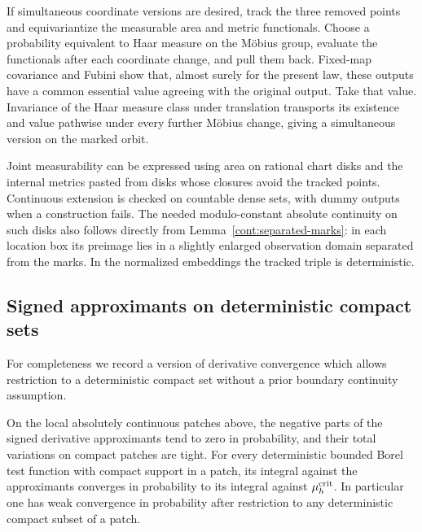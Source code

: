 \begin{remark}
\label{cont:orbit-versions}
If simultaneous coordinate versions are desired, track the three removed
points and equivariantize the measurable area and metric functionals.
Choose a probability equivalent to Haar measure on the M\"obius group,
evaluate the functionals after each coordinate change, and pull them back.
Fixed-map covariance and Fubini show that, almost surely for the present
law, these outputs have a common essential value agreeing with the
original output.  Take that value.  Invariance of the Haar measure class
under translation transports its existence and value pathwise under every
further M\"obius change, giving a simultaneous version on the marked orbit.

Joint measurability can be expressed using area on rational chart disks and
the internal metrics pasted from disks whose closures avoid the tracked
points.  Continuous extension is checked on countable dense sets, with
dummy outputs when a construction fails.  The needed modulo-constant
absolute continuity on such disks also follows directly from
Lemma~\ref{cont:separated-marks}: in each location box its preimage lies in
a slightly enlarged observation domain separated from the marks.  In the
normalized embeddings the tracked triple is deterministic.
\end{remark}

\subsection{Signed approximants on deterministic compact sets}
\label{cont:compact-restrictions-section}

For completeness we record a version of derivative convergence which allows
restriction to a deterministic compact set without a prior boundary
continuity assumption.

\begin{lemma}\label{cont:compact-restrictions}
On the local absolutely continuous patches above, the negative parts of the
signed derivative approximants tend to zero in probability, and their total
variations on compact patches are tight.  For every deterministic bounded
Borel test function with compact support in a patch, its integral against
the approximants converges in probability to its integral against
$\mu_h^{\rm crit}$.  In particular one has weak
convergence in probability after restriction to any deterministic compact
subset of a patch.
\end{lemma}

